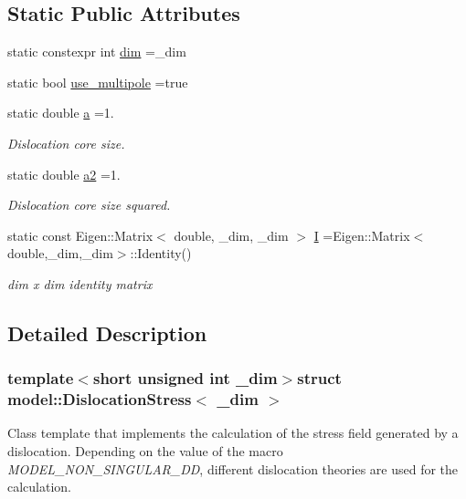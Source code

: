 \subsection*{Static Public Attributes}
\begin{DoxyCompactItemize}
\item 
static constexpr int \hyperlink{structmodel_1_1_dislocation_stress_acd45411c1dd348187e8a3ecdda35d793}{dim} =\+\_\+dim
\item 
static bool \hyperlink{structmodel_1_1_dislocation_stress_a9979f89edcb85c3c615dcbfd061f8bbe}{use\+\_\+multipole} =true
\item 
static double \hyperlink{structmodel_1_1_dislocation_stress_a529aca4e2c4c39d998cdf082237e4d52}{a} =1.
\begin{DoxyCompactList}\small\item\em Dislocation core size. \end{DoxyCompactList}\item 
static double \hyperlink{structmodel_1_1_dislocation_stress_a5f7535a11c63e1ce41853b3c645e49ef}{a2} =1.
\begin{DoxyCompactList}\small\item\em Dislocation core size squared. \end{DoxyCompactList}\item 
static const Eigen\+::\+Matrix$<$ double, \+\_\+dim, \+\_\+dim $>$ \hyperlink{structmodel_1_1_dislocation_stress_a0a408e1c7332c94d8054a57a92094989}{I} =Eigen\+::\+Matrix$<$double,\+\_\+dim,\+\_\+dim$>$\+::Identity()
\begin{DoxyCompactList}\small\item\em dim x dim identity matrix \end{DoxyCompactList}\end{DoxyCompactItemize}


\subsection{Detailed Description}
\subsubsection*{template$<$short unsigned int \+\_\+dim$>$struct model\+::\+Dislocation\+Stress$<$ \+\_\+dim $>$}

Class template that implements the calculation of the stress field generated by a dislocation. Depending on the value of the macro {\itshape M\+O\+D\+E\+L\+\_\+\+N\+O\+N\+\_\+\+S\+I\+N\+G\+U\+L\+A\+R\+\_\+\+D\+D}, different dislocation theories are used for the calculation. 

